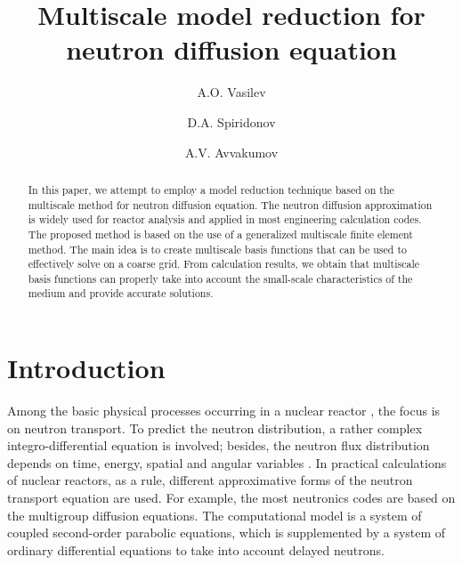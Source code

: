 \documentclass[runningheads]{llncs}
\begin{document}
\title{Multiscale model reduction for neutron diffusion equation}

\author{A.O. Vasilev \and D.A. Spiridonov \and A.V. Avvakumov }



\maketitle

\begin{abstract}
In this paper, we attempt to employ a model reduction technique based on the multiscale method for neutron diffusion equation. 
The neutron diffusion approximation is widely used for reactor analysis and applied in most engineering calculation codes. 
The proposed method is based on the use of a generalized multiscale finite element method.
The main idea is to create multiscale basis functions that can be used to effectively solve on a coarse grid.
From calculation results, we obtain that multiscale basis functions can properly take into account the small-scale characteristics of the medium and provide accurate solutions. 


\end{abstract}

\section{Introduction}

Among the basic physical processes occurring in a nuclear reactor \cite{Duderstadt1976}, the focus is on neutron transport. 
To predict the neutron distribution, a rather complex integro-differential equation is involved; besides, the neutron flux distribution depends on time, energy, spatial and angular variables \cite{Stacey2007}.
In practical calculations of nuclear reactors, as a rule,  different approximative forms of the neutron transport equation are used. For example, the most neutronics codes are based on the multigroup diffusion equations.
The computational model is a system of coupled second-order parabolic equations, which is supplemented by a system of ordinary differential equations to take into account delayed neutrons.
\end{document}

